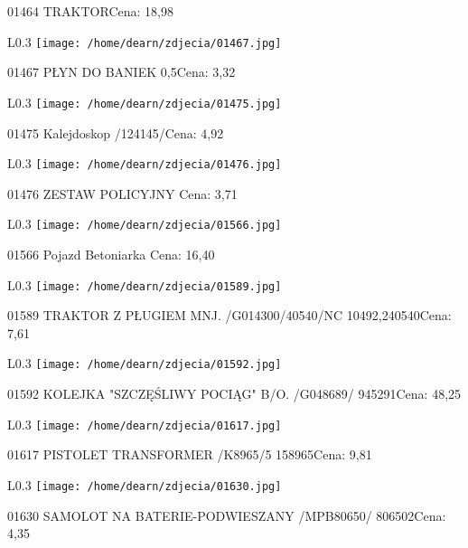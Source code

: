 01464 TRAKTORCena: 18,98\newline
\begin{wrapfigure}{L}{0.3\textwidth}
\texttt{[image: /home/dearn/zdjecia/01467.jpg]}
\end{wrapfigure}
01467 PŁYN DO BANIEK 0,5Cena: 3,32\newline
\begin{wrapfigure}{L}{0.3\textwidth}
\texttt{[image: /home/dearn/zdjecia/01475.jpg]}
\end{wrapfigure}
01475 Kalejdoskop   /124145/Cena: 4,92\newline
\begin{wrapfigure}{L}{0.3\textwidth}
\texttt{[image: /home/dearn/zdjecia/01476.jpg]}
\end{wrapfigure}
01476 ZESTAW POLICYJNY Cena: 3,71\newline
\begin{wrapfigure}{L}{0.3\textwidth}
\texttt{[image: /home/dearn/zdjecia/01566.jpg]}
\end{wrapfigure}
01566 Pojazd Betoniarka Cena: 16,40\newline
\begin{wrapfigure}{L}{0.3\textwidth}
\texttt{[image: /home/dearn/zdjecia/01589.jpg]}
\end{wrapfigure}
01589 TRAKTOR Z PŁUGIEM MNJ. /G014300/40540/NC  10492,240540Cena: 7,61\newline
\begin{wrapfigure}{L}{0.3\textwidth}
\texttt{[image: /home/dearn/zdjecia/01592.jpg]}
\end{wrapfigure}
01592 KOLEJKA "SZCZĘŚLIWY POCIĄG" B/O. /G048689/      945291Cena: 48,25\newline
\begin{wrapfigure}{L}{0.3\textwidth}
\texttt{[image: /home/dearn/zdjecia/01617.jpg]}
\end{wrapfigure}
01617 PISTOLET TRANSFORMER /K8965/5                   158965Cena: 9,81\newline
\begin{wrapfigure}{L}{0.3\textwidth}
\texttt{[image: /home/dearn/zdjecia/01630.jpg]}
\end{wrapfigure}
01630 SAMOLOT NA BATERIE-PODWIESZANY /MPB80650/       806502Cena: 4,35\newline
